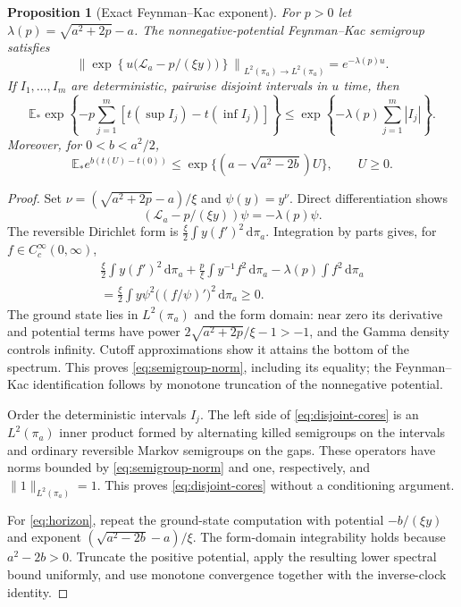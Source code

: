 \documentclass[11pt,reqno]{amsart}
\theoremstyle{plain}
\newtheorem{proposition}[theorem]{Proposition}
\theoremstyle{definition}
\theoremstyle{remark}
\newcommand{\E}{\mathbb E}
\newcommand{\1}{\mathbf{1}}
\newcommand{\dd}{\,\mathrm d}
\begin{document}
\begin{proposition}[Exact Feynman--Kac exponent]\label{prop:spectral}
For $p>0$ let $\lambda(p)=\sqrt{a^2+2p}-a$. The nonnegative-potential Feynman--Kac semigroup satisfies
\begin{equation}\label{eq:semigroup-norm}
\left\|\exp\left\{u\bigl(\mathcal L_a-p/(\xi y)\bigr)\right\}\right\|_{L^2(\pi_a)\to L^2(\pi_a)}=e^{-\lambda(p)u}.
\end{equation}
If $I_1,\ldots,I_m$ are deterministic, pairwise disjoint intervals in $u$ time, then
\begin{equation}\label{eq:disjoint-cores}
\E_*\exp\left\{-p\sum_{j=1}^m[t(\sup I_j)-t(\inf I_j)]\right\}
\le \exp\left\{-\lambda(p)\sum_{j=1}^m|I_j|\right\}.
\end{equation}
Moreover, for $0<b<a^2/2$,
\begin{equation}\label{eq:horizon}
\E_* e^{b(t(U)-t(0))}\le\exp\{(a-\sqrt{a^2-2b})U\},\qquad U\ge0.
\end{equation}
\end{proposition}
\begin{proof}
Set $\nu=(\sqrt{a^2+2p}-a)/\xi$ and $\psi(y)=y^\nu$. Direct differentiation shows
\begin{equation}\label{eq:ground}
(\mathcal L_a-p/(\xi y))\psi=-\lambda(p)\psi.
\end{equation}
The reversible Dirichlet form is $\frac\xi2\int y(f')^2\dd\pi_a$. Integration by parts gives, for $f\in C_c^\infty(0,\infty)$,
\begin{multline}\label{eq:groundstate}
\frac\xi2\int y(f')^2\dd\pi_a+\frac p\xi\int y^{-1}f^2\dd\pi_a
-\lambda(p)\int f^2\dd\pi_a\\
=\frac\xi2\int y\psi^2\bigl((f/\psi)'\bigr)^2\dd\pi_a\ge0.
\end{multline}
The ground state lies in $L^2(\pi_a)$ and the form domain: near zero its derivative and potential terms have power $2\sqrt{a^2+2p}/\xi-1>-1$, and the Gamma density controls infinity. Cutoff approximations show it attains the bottom of the spectrum. This proves \eqref{eq:semigroup-norm}, including its equality; the Feynman--Kac identification follows by monotone truncation of the nonnegative potential.

Order the deterministic intervals $I_j$. The left side of \eqref{eq:disjoint-cores} is an $L^2(\pi_a)$ inner product formed by alternating killed semigroups on the intervals and ordinary reversible Markov semigroups on the gaps. These operators have norms bounded by \eqref{eq:semigroup-norm} and one, respectively, and $\|1\|_{L^2(\pi_a)}=1$. This proves \eqref{eq:disjoint-cores} without a conditioning argument.

For \eqref{eq:horizon}, repeat the ground-state computation with potential $-b/(\xi y)$ and exponent $(\sqrt{a^2-2b}-a)/\xi$. The form-domain integrability holds because $a^2-2b>0$. Truncate the positive potential, apply the resulting lower spectral bound uniformly, and use monotone convergence together with the inverse-clock identity.
\end{proof}
\end{document}
